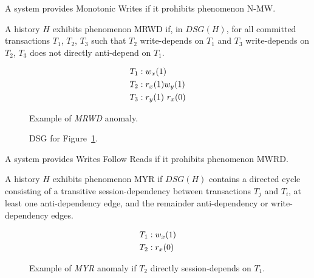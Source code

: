 \begin{definition}
A system provides Monotonic Writes if it prohibits phenomenon N-MW.
\end{definition}

\begin{definition}
A history $H$ exhibits phenomenon MRWD if, in $DSG(H)$, for all
committed transactions $T_1$, $T_2$, $T_3$ such that $T_2$
write-depends on $T_1$ and $T_3$ write-depends on $T_2$, $T_3$ does
not directly anti-depend on $T_1$.
\end{definition}


\begin{figure}[H]
\begin{align*}
\small
T_1 &: w_x(1)\\
T_2 &: r_x(1) w_y(1)\\
T_3 &: r_y(1)~r_x(0)
\end{align*}
\caption{Example of \textit{MRWD} anomaly.}
\label{fig:nwfr-history}
\end{figure}

\begin{figure}[H]
\centering
{}
\caption{DSG for Figure~\ref{fig:nwfr-history}.}
\label{fig:nwfr-dsg}
\end{figure}

\begin{definition}
A system provides Writes Follow Reads if it prohibits phenomenon MWRD.
\end{definition}

\begin{definition}
A history $H$ exhibits phenomenon MYR if $DSG(H)$ contains a directed cycle
consisting of a transitive session-dependency between transactions
$T_j$ and $T_i$, at least one anti-dependency edge, and the remainder
anti-dependency or write-dependency edges.
\end{definition}


\begin{figure}[H]
\begin{align*}
\small
T_1 &: w_x(1)\\
T_2 &: r_x(0)\\
\end{align*}
\caption{Example of \textit{MYR} anomaly if $T_2$ directly session-depends on $T_1$.}
\label{fig:nryw-history}
\end{figure}

